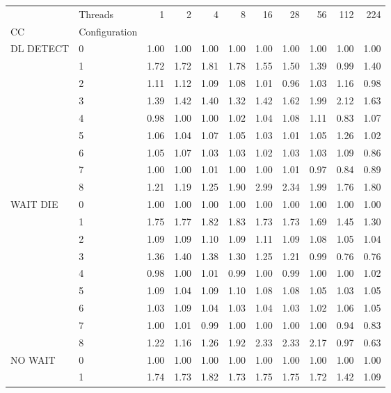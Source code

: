 \begin{tabular}{llrrrrrrrrr}
\toprule
       & Threads &  1   &  2   &  4   &  8   &  16  &  28  &  56  &  112 &  224 \\
CC & Configuration &      &      &      &      &      &      &      &      &      \\
\midrule
DL DETECT & 0 & 1.00 & 1.00 & 1.00 & 1.00 & 1.00 & 1.00 & 1.00 & 1.00 & 1.00 \\
       & 1 & 1.72 & 1.72 & 1.81 & 1.78 & 1.55 & 1.50 & 1.39 & 0.99 & 1.40 \\
       & 2 & 1.11 & 1.12 & 1.09 & 1.08 & 1.01 & 0.96 & 1.03 & 1.16 & 0.98 \\
       & 3 & 1.39 & 1.42 & 1.40 & 1.32 & 1.42 & 1.62 & 1.99 & 2.12 & 1.63 \\
       & 4 & 0.98 & 1.00 & 1.00 & 1.02 & 1.04 & 1.08 & 1.11 & 0.83 & 1.07 \\
       & 5 & 1.06 & 1.04 & 1.07 & 1.05 & 1.03 & 1.01 & 1.05 & 1.26 & 1.02 \\
       & 6 & 1.05 & 1.07 & 1.03 & 1.03 & 1.02 & 1.03 & 1.03 & 1.09 & 0.86 \\
       & 7 & 1.00 & 1.00 & 1.01 & 1.00 & 1.00 & 1.01 & 0.97 & 0.84 & 0.89 \\
       & 8 & 1.21 & 1.19 & 1.25 & 1.90 & 2.99 & 2.34 & 1.99 & 1.76 & 1.80 \\
WAIT DIE & 0 & 1.00 & 1.00 & 1.00 & 1.00 & 1.00 & 1.00 & 1.00 & 1.00 & 1.00 \\
       & 1 & 1.75 & 1.77 & 1.82 & 1.83 & 1.73 & 1.73 & 1.69 & 1.45 & 1.30 \\
       & 2 & 1.09 & 1.09 & 1.10 & 1.09 & 1.11 & 1.09 & 1.08 & 1.05 & 1.04 \\
       & 3 & 1.36 & 1.40 & 1.38 & 1.30 & 1.25 & 1.21 & 0.99 & 0.76 & 0.76 \\
       & 4 & 0.98 & 1.00 & 1.01 & 0.99 & 1.00 & 0.99 & 1.00 & 1.00 & 1.02 \\
       & 5 & 1.09 & 1.04 & 1.09 & 1.10 & 1.08 & 1.08 & 1.05 & 1.03 & 1.05 \\
       & 6 & 1.03 & 1.09 & 1.04 & 1.03 & 1.04 & 1.03 & 1.02 & 1.06 & 1.05 \\
       & 7 & 1.00 & 1.01 & 0.99 & 1.00 & 1.00 & 1.00 & 1.00 & 0.94 & 0.83 \\
       & 8 & 1.22 & 1.16 & 1.26 & 1.92 & 2.33 & 2.33 & 2.17 & 0.97 & 0.63 \\
NO WAIT & 0 & 1.00 & 1.00 & 1.00 & 1.00 & 1.00 & 1.00 & 1.00 & 1.00 & 1.00 \\
       & 1 & 1.74 & 1.73 & 1.82 & 1.73 & 1.75 & 1.75 & 1.72 & 1.42 & 1.09 \\

\end{tabular}
